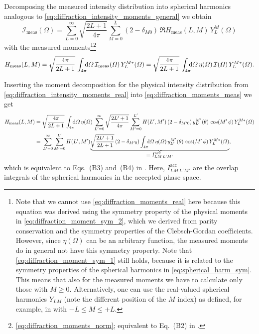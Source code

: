 Decomposing the measured intensity distribution into spherical
harmonics analogous to \cref{eq:diffraction_intensity_moments_general}
we obtain
\begin{equation}
  \label{eq:diffraction_intensity_moments_meas}
  \mathcal{I}_\text{meas}(\Omega)
  = \sum_{L = 0}^\infty \sqrt{\frac{2 L + 1}{4 \pi}} \sum_{M = 0}^{L} (2 - \delta_{M 0})\, \Re{H_\text{meas}(L, M)\, Y_L^M(\Omega)}
\end{equation}
with the measured
moments\footnote{\label{fn:complex_moment_decomp}Note that we cannot
use \cref{eq:diffraction_moments_real} here because this equation was
derived using the symmetry property of the physical moments in
\cref{eq:diffraction_moment_sym_2}, which we derived from parity
conservation and the symmetry properties of the Clebsch-Gordan
coefficients.  However, since $\eta(\Omega)$ can be an arbitrary
function, the measured moments do in general not have this symmetry
property.  Note that \cref{eq:diffraction_moment_sym_1} still holds,
because it is related to the symmetry properties of the spherical
harmonics in \cref{eq:spherical_harm_sym}.  This means that also for
the measured moments we have to calculate only those with $M \geq 0$.
Alternatively, one can use the real-valued spherical harmonics $Y_{L
M}$ (note the different position of the $M$ index) as defined, for
example, in  with $-L
\leq M \leq +L$.}\footnote{\Confer \cref{eq:diffraction_moments_norm};
equivalent to Eq.~(B2) in .}
\begin{equation}
  \label{eq:diffraction_moments_meas}
  H_\text{meas}(L, M)
  = \sqrt{\frac{4 \pi}{2 L + 1}}\, \int_{4 \pi}\!\!\! \dif{\Omega}\, \mathcal{I}_\text{meas}(\Omega)\, Y_L^{M *}(\Omega)
  = \sqrt{\frac{4 \pi}{2 L + 1}}\, \int_{4 \pi}\!\!\! \dif{\Omega}\, \eta(\Omega)\, \mathcal{I}(\Omega)\, Y_L^{M *}(\Omega).
\end{equation}

Inserting the moment decomposition for the physical intensity distribution
from \cref{eq:diffraction_intensity_moments_real} into
\cref{eq:diffraction_moments_meas} we get
\begin{align}
  H_\text{meas}(L, M)
  ={}& \sqrt{\frac{4 \pi}{2 L + 1}}\, \int_{4 \pi}\!\!\! \dif{\Omega}\, \eta(\Omega)\,
  \sum_{L' = 0}^\infty \sqrt{\frac{2 L' + 1}{4 \pi}} \sum_{M' = 0}^{L'} H(L', M')\, (2 - \delta_{M' 0})\, y_{L'}^{M'}(\theta)\, \cos(M'\, \phi)\,
  Y_L^{M *}(\Omega) \notag \\
  \label{eq:diffraction_moments_meas2}
  ={}& \sum_{L' = 0}^\infty \sum_{M' = 0}^{L'} H(L', M')
  \dUnderbrace{\sqrt{\frac{2 L' + 1}{2 L + 1}}\, (2 - \delta_{M' 0}) \int_{4 \pi}\!\!\! \dif{\Omega}\, \eta(\Omega)\,
  y_{L'}^{M'}(\theta)\, \cos(M'\, \phi)\, Y_L^{M *}(\Omega)}{\equiv I^\text{acc}_{L M\, L' M'}},
\end{align}
which is equivalent to Eqs.~(B3) and~(B4) in .
Here, $I^\text{acc}_{L M\, L' M'}$ are the overlap integrals of the
spherical harmonics in the accepted phase space.

